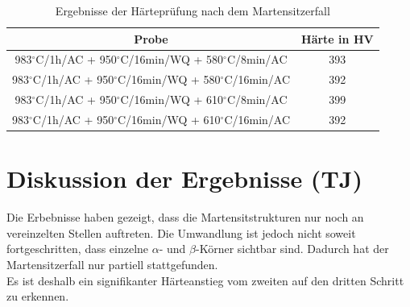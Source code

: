 \begin{table}
	\centering
	\begin{tabular}{|c|c|}
		\hline 
		Probe & Härte in HV \\ 
		\hline 
		983$^\circ$C/1h/AC + 950$^\circ$C/16min/WQ + 580$^\circ$C/8min/AC & 393 \\ 
		\hline 
		983$^\circ$C/1h/AC + 950$^\circ$C/16min/WQ + 580$^\circ$C/16min/AC & 392 \\ 
		\hline 
		983$^\circ$C/1h/AC + 950$^\circ$C/16min/WQ + 610$^\circ$C/8min/AC & 399 \\ 
		\hline 
		983$^\circ$C/1h/AC + 950$^\circ$C/16min/WQ + 610$^\circ$C/16min/AC & 392 \\ 
		\hline 
	\end{tabular} 
	\caption{Ergebnisse der Härteprüfung nach dem Martensitzerfall}
	\label{Tabelle 8}
\end{table}

\section{Diskussion der Ergebnisse (TJ)}

Die Erbebnisse haben gezeigt, dass die Martensitstrukturen nur noch an vereinzelten Stellen auftreten. Die Umwandlung ist jedoch nicht soweit fortgeschritten, dass einzelne $\alpha$- und $\beta$-Körner sichtbar sind.
Dadurch hat der Martensitzerfall nur partiell stattgefunden.\\
Es ist deshalb ein signifikanter Härteanstieg vom zweiten auf den dritten Schritt zu erkennen. 



